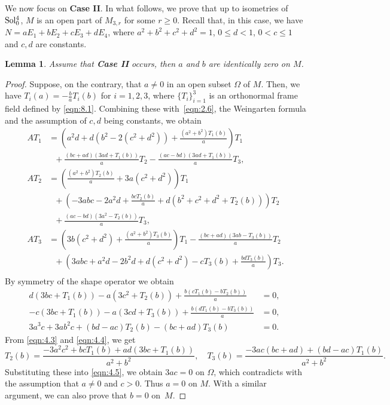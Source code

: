 \documentclass[reqno]{amsart}%
\newtheorem{lemma}[theorem]{Lemma}
\theoremstyle{definition}
\numberwithin{equation}{section}
\begin{document}
	
	We now focus on {\bf Case II}.
	In what follows, we prove that up to isometries of ${\rm Sol_0^4}$,
	$M$ is an open part of $M_{3,r}$ for some $r\geq0$.
	Recall that, in this case, we have $N=aE_1+bE_2+cE_3+dE_4$, where
	$a^2+b^2+c^2+d^2=1$, $0\leq d<1$, $0<c\leq 1$ and $c,d$ are constants.
	\begin{lemma}
		\label{lemma:case2-ab-zero}
		Assume that {\bf Case II} occurs, then $a$ and $b$ are identically zero on $M$.
	\end{lemma}
	\begin{proof}
		Suppose, on the contrary, that $a\neq0$ in an open subset $\Omega$ of $M$.
		Then, we have $T_i(a)=-\tfrac{b}{a}T_i(b)$ for $i=1,2,3$, where $\{T_i\}_{i=1}^3$
		is an orthonormal frame field defined
		by \eqref{eqn:8.1}.
		Combining these with~\eqref{eqn:2.6},
		the Weingarten formula and the assumption of $c, d$ being constants, we obtain
		\begin{equation*}
			\begin{aligned}
				AT_1
				&=\left(a^2d+d(b^2-2(c^2+d^2))+\tfrac{(a^2+b^2)T_1(b)}{a}\right)T_1 \\
				& \ \ \ +\tfrac{(bc+ad)(3ad+T_1(b))}{a}T_2-\tfrac{(ac-bd)(3ad+T_1(b))}{a}T_3,\\
				AT_2
				&=\left(\tfrac{(a^2+b^2)T_2(b)}{a}+3a(c^2+d^2)\right)T_1 \\
				& \ \ \ +\left(-3abc-2a^2d+\tfrac{bcT_2(b)}{a}+d(b^2+c^2+d^2+T_2(b))\right)T_2 \\
				& \ \ \ +\tfrac{(ac-bd)(3a^2-T_2(b))}{a}T_3,\\
				AT_3
				&=\left(3b(c^2+d^2)+\tfrac{(a^2+b^2)T_3(b)}{a}\right)T_1
				-\tfrac{(bc+ad)(3ab-T_3(b))}{a}T_2\\
				& \ \ \ +\left(3abc+a^2d-2b^2d+d(c^2+d^2)-cT_3(b)+\tfrac{bdT_3(b)}{a}\right)T_3. \\
			\end{aligned}
		\end{equation*}
		By symmetry of the shape operator we obtain
		\begin{align}
			d(3bc+T_1(b))-a(3c^2+T_2(b))+\tfrac{b(cT_1(b)-bT_2(b))}{a}&=0,\label{eqn:4.3}\\
			-c(3bc+T_1(b))-a(3cd+T_3(b))+\tfrac{b(dT_1(b)-bT_3(b))}{a}&=0,~\label{eqn:4.4}\\
			3a^3c+3ab^2c+(bd-ac)T_2(b)-(bc+ad)T_3(b)&=0.~\label{eqn:4.5}
		\end{align}
		From \eqref{eqn:4.3} and \eqref{eqn:4.4}, we get
		\begin{equation*}
			T_2(b) = \frac{-3a^2c^2+bcT_1(b)+ad(3bc+T_1(b))}{a^2+b^2},\quad
			T_3(b) = \frac{-3ac(bc+ad)+(bd-ac)T_1(b)}{a^2+b^2}.
		\end{equation*}
		Substituting these into \eqref{eqn:4.5}, we obtain $3ac=0$ on $\Omega$,
		which contradicts with the assumption that $a\neq0$ and $c > 0$.
		Thus $a=0$ on $M$.
		With a similar argument, we can also prove that $b=0$ on~$M$.
	\end{proof}
	
\end{document}
